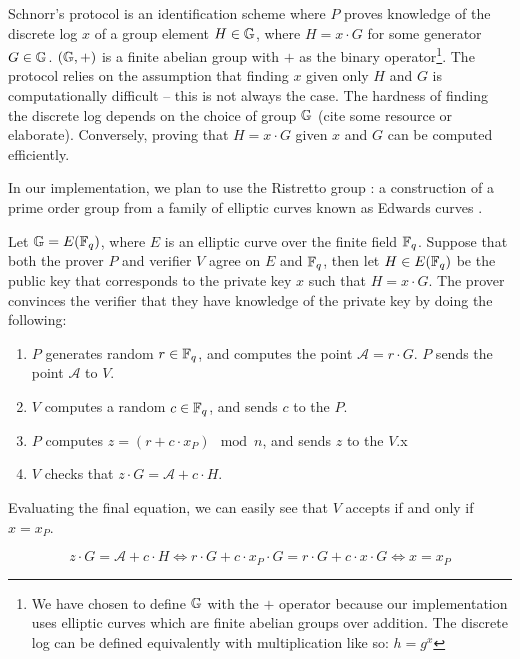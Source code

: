 Schnorr's protocol \cite{Schnorr} is an identification scheme where $P$ proves knowledge of the discrete log $x$ of a group element $H \in \mathbb{G}$, where $H = x \cdot G$ for some generator $G \in \mathbb{G}$. $(\mathbb{G}, +)$ is a finite abelian group with $+$ as the binary operator\footnote{We have chosen to define $\mathbb{G}$ with the $+$ operator because our implementation uses elliptic curves which are finite abelian groups over addition. The discrete log can be defined equivalently with multiplication like so: $h = g^x$}. The protocol relies on the assumption that finding $x$ given only $H$ and $G$ is computationally difficult -- this is not always the case. The hardness of finding the discrete log depends on the choice of group $\mathbb{G}$ (cite some resource or elaborate). Conversely, proving that $H = x \cdot G$ given $x$ and $G$ can be computed efficiently. 

In our implementation, we plan to use the Ristretto group \cite{ristretto_web}: a construction of a prime order group from a family of elliptic curves known as Edwards curves \cite{Edwards2007}. 

\begin{definition}
Let $\mathbb{G} = E(\mathbb{F}_q)$, where $E$ is an elliptic curve over the finite field $\mathbb{F}_q$. Suppose that both the prover $P$ and verifier $V$ agree on $E$ and $\mathbb{F}_q$, then let $H \in E(\mathbb{F}_q)$ be the public key that corresponds to the private key $x$ such that $H = x \cdot G$. The prover convinces the verifier that they have knowledge of the private key by doing the following:

\begin{enumerate}
    \item $P$ generates random $r \in \mathbb{F}_q$, and computes the point $\mathcal A = r \cdot G$. $P$ sends the point $\mathcal A$ to $V$.
    \item $V$ computes a random $c \in \mathbb{F}_q$, and sends $c$ to the $P$.
    \item $P$ computes $z = (r + c \cdot x_P) \mod n$, and sends $z$ to the $V$.x
    \item $V$ checks that $z \cdot G = \mathcal A + c \cdot H$.
\end{enumerate} 

Evaluating the final equation, we can easily see that $V$ accepts if and only if $x = x_P$. 

\begin{equation*}
    z \cdot G = \mathcal A + c \cdot H \iff
    r \cdot G + c \cdot x_P \cdot G  = r \cdot G + c \cdot x \cdot G \iff
    x  =  x_P
\end{equation*}
\end{definition}


